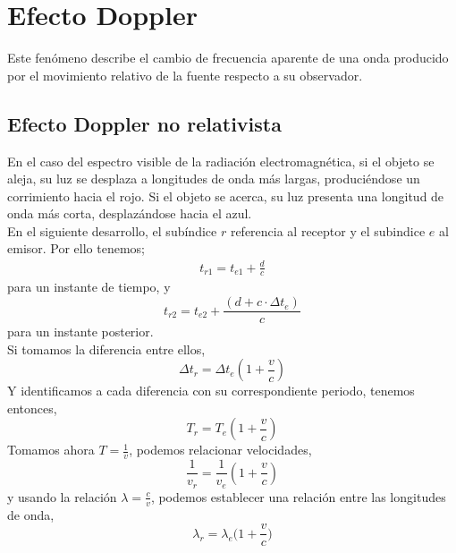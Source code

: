\documentclass[openany]{book}
\theoremstyle{ucostyle}
\begin{document}
\section{Efecto Doppler}
Este fenómeno describe el cambio de frecuencia aparente de una onda producido por el movimiento relativo de la fuente respecto a su observador. 

\subsection{Efecto Doppler no relativista}
En el caso del espectro visible de la radiación electromagnética, si el objeto se aleja, su luz se desplaza a longitudes de onda más largas, produciéndose un corrimiento hacia el rojo. Si el objeto se acerca, su luz presenta una longitud de onda más corta, desplazándose hacia el azul.
\\



En el siguiente desarrollo, el subíndice $r$ referencia al receptor y el subindice $e$ al emisor. Por ello tenemos; 
\begin{align*}
    t_{r1}=t_{e1}+ \frac{d}{c}
\end{align*}
para un instante de tiempo, y
\begin{equation*}
        t_{r2}=t_{e2} + \frac{(d+c \cdot\Delta t_e)}{c}
\end{equation*}
para un instante posterior. 
\\

Si tomamos la diferencia entre ellos, 
\begin{equation*}
    \Delta t _r = \Delta t _e (1+ \frac{v}{c})
\end{equation*}
Y identificamos a cada diferencia con su correspondiente periodo, tenemos entonces, 
\begin{equation*}
    T_r=T_e(1+\frac{v}{c}) 
\end{equation*}
Tomamos ahora ${T=\frac{1}{v}} $, podemos relacionar velocidades,
\begin{equation*}
    \frac{1}{v_r}=\frac{1}{v_e}(1+\frac{v}{c})
\end{equation*}
y usando la relación $\lambda=\frac{c}{v}$, podemos establecer una relación entre las longitudes de onda, 
\begin{equation*}
    \lambda_r=\lambda_e \big( 1 + \frac{v}{c}\big)
\end{equation*}
\end{document}
